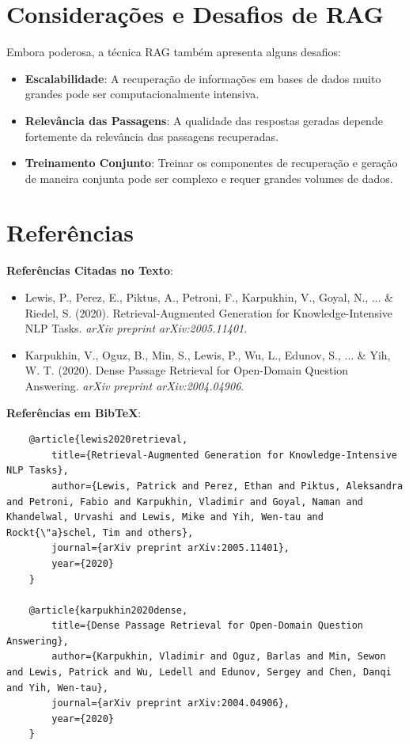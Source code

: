 \documentclass[14pt,a4paper,oneside]{book}
\begin{document}
\section{Considerações e Desafios de RAG}

Embora poderosa, a técnica RAG também apresenta alguns desafios:

\begin{itemize}
	\item \textbf{Escalabilidade}: A recuperação de informações em bases de dados muito grandes pode ser computacionalmente intensiva.
	\item \textbf{Relevância das Passagens}: A qualidade das respostas geradas depende fortemente da relevância das passagens recuperadas.
	\item \textbf{Treinamento Conjunto}: Treinar os componentes de recuperação e geração de maneira conjunta pode ser complexo e requer grandes volumes de dados.
\end{itemize}

\section{Referências}

\textbf{Referências Citadas no Texto}:

\begin{itemize}
	\item Lewis, P., Perez, E., Piktus, A., Petroni, F., Karpukhin, V., Goyal, N., ... \& Riedel, S. (2020). Retrieval-Augmented Generation for Knowledge-Intensive NLP Tasks. \textit{arXiv preprint arXiv:2005.11401}.
	\item Karpukhin, V., Oguz, B., Min, S., Lewis, P., Wu, L., Edunov, S., ... \& Yih, W. T. (2020). Dense Passage Retrieval for Open-Domain Question Answering. \textit{arXiv preprint arXiv:2004.04906}.
\end{itemize}

\textbf{Referências em BibTeX}:

\begin{verbatim}
	@article{lewis2020retrieval,
		title={Retrieval-Augmented Generation for Knowledge-Intensive NLP Tasks},
		author={Lewis, Patrick and Perez, Ethan and Piktus, Aleksandra and Petroni, Fabio and Karpukhin, Vladimir and Goyal, Naman and Khandelwal, Urvashi and Lewis, Mike and Yih, Wen-tau and Rockt{\"a}schel, Tim and others},
		journal={arXiv preprint arXiv:2005.11401},
		year={2020}
	}
	
	@article{karpukhin2020dense,
		title={Dense Passage Retrieval for Open-Domain Question Answering},
		author={Karpukhin, Vladimir and Oguz, Barlas and Min, Sewon and Lewis, Patrick and Wu, Ledell and Edunov, Sergey and Chen, Danqi and Yih, Wen-tau},
		journal={arXiv preprint arXiv:2004.04906},
		year={2020}
	}
\end{verbatim}
\end{document}
